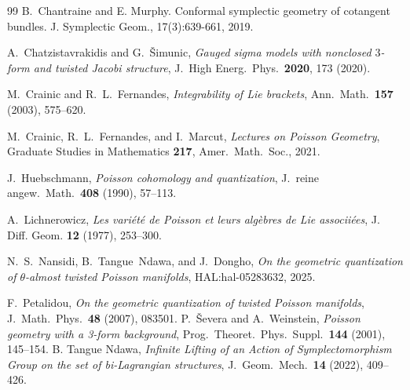 \documentclass[11pt,a4paper]{article}
\theoremstyle{plain}
\theoremstyle{definition}
\theoremstyle{remark}
\begin{document}
\begin{thebibliography}{99}
B.~Chantraine and E. Murphy. Conformal symplectic geometry of cotangent bundles. J.
Symplectic Geom., 17(3):639-661, 2019.

A.~Chatzistavrakidis and G.~\v{S}imunic,
\textit{Gauged sigma models with nonclosed $3$-form and twisted
	Jacobi structure},
J.\ High Energ.\ Phys.\ \textbf{2020}, 173 (2020).

M.~Crainic and R.~L.~Fernandes,
\textit{Integrability of Lie brackets},
Ann.\ Math.\ \textbf{157} (2003), 575--620.

M.~Crainic, R.~L.~Fernandes, and I.~Marcut,
\textit{Lectures on Poisson Geometry},
Graduate Studies in Mathematics \textbf{217},
Amer.\ Math.\ Soc., 2021.

J.~Huebschmann,
\textit{Poisson cohomology and quantization},
J.\ reine angew.\ Math.\ \textbf{408} (1990), 57--113.

A.~Lichnerowicz,
\textit{Les vari\'{e}t\'{e} de Poisson et leurs alg\`{e}bres de Lie associi\'{e}es},
J. Diff. Geom. \textbf{12} (1977), 253--300.

N.~S.~Nansidi, B.~Tangue~Ndawa, and J.~Dongho,
\textit{On the geometric quantization of $\theta$-almost twisted
	Poisson manifolds},
HAL:hal-05283632, 2025.

F.~Petalidou,
\textit{On the geometric quantization of twisted Poisson manifolds},
J.\ Math.\ Phys.\ \textbf{48} (2007), 083501.
P.~\v{S}evera and A.~Weinstein,
\textit{Poisson geometry with a 3-form background},
Prog.\ Theoret.\ Phys.\ Suppl.\ \textbf{144} (2001), 145--154.
B. Tangue Ndawa, \textit{Infinite Lifting of an Action of Symplectomorphism Group on the set of bi-Lagrangian structures},
J.~Geom.\  Mech.\  \textbf{14} (2022), 409--426.
\end{thebibliography}
\end{document}
